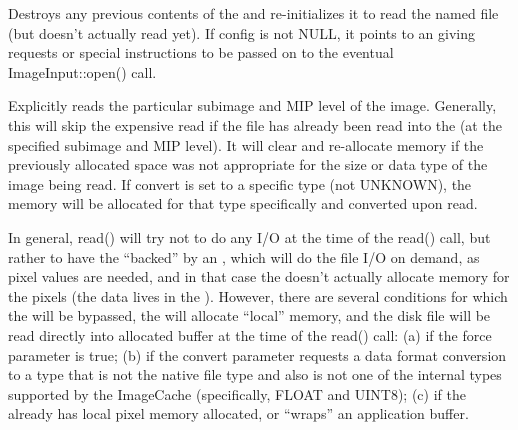 Destroys any previous contents of the \ImageBuf and re-initializes it
to read the named file (but doesn't actually read yet).
If {\cf config} is not NULL, it points to an \ImageSpec giving requests
or special instructions to be passed on to the eventual
{\cf ImageInput::open()} call.
\apiend


Explicitly reads the particular subimage and MIP level of the image.  Generally,
this will skip the expensive read if the file has already been read into
the \ImageBuf (at the specified subimage and MIP level).  It will clear
and re-allocate memory if the previously allocated space was not
appropriate for the size or data type of the image being read.
If {\cf convert} is set to a specific type (not {\cf UNKNOWN}), the
\ImageBuf memory will be allocated for that type specifically and
converted upon read.

In general, {\cf read()} will try not to do any I/O at the time of the
{\cf read()} call, but rather to have the \ImageBuf ``backed'' by an
\ImageCache, which will do the file I/O on demand, as pixel values are
needed, and in that case the \ImageBuf doesn't actually allocate memory
for the pixels (the data lives in the \ImageCache).  However, there are
several conditions for which the \ImageCache will be bypassed, the
\ImageBuf will allocate ``local'' memory, and the disk file will be read
directly into allocated buffer at the time of the {\cf read()} call:
(a) if the {\cf force} parameter is {\cf true}; (b) if the {\cf convert}
parameter requests a data format conversion to a type that is not the
native file type and also is not one of the internal types supported by
the {\cf ImageCache} (specifically, {\cf FLOAT} and {\cf UINT8});
(c) if the \ImageBuf already has local pixel memory allocated, or
``wraps'' an application buffer.

